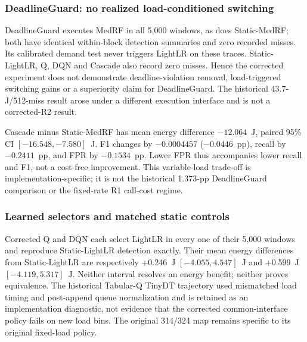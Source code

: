 \begin{table}[t]
\centering\footnotesize
\caption{Headline R2 paired contrasts ($n=10$ blocks). Differences are first-minus-second method; F1 and deadline-miss changes are percentage points.}
\label{tab:r2pairs}
\setlength{\tabcolsep}{5pt}
\end{table}

\subsubsection*{DeadlineGuard: no realized load-conditioned switching}
DeadlineGuard executes MedRF in all 5{,}000 windows, as does Static-MedRF; both have identical within-block detection summaries and zero recorded misses. Its calibrated demand test never triggers LightLR on these traces. Static-LightLR, Q, DQN and Cascade also record zero misses. Hence the corrected experiment does not demonstrate deadline-violation removal, load-triggered switching gains or a superiority claim for DeadlineGuard. The historical 43.7-J/512-miss result arose under a different execution interface and is not a corrected-R2 result.

Cascade minus Static-MedRF has mean energy difference $-12.064$~J, paired 95\% CI $[-16.548,-7.580]$~J. F1 changes by $-0.0004457$ ($-0.0446$~pp), recall by $-0.2411$~pp, and FPR by $-0.1534$~pp. Lower FPR thus accompanies lower recall and F1, not a cost-free improvement. This variable-load trade-off is implementation-specific; it is not the historical 1.373-pp DeadlineGuard comparison or the fixed-rate R1 call-cost regime.

\subsubsection*{Learned selectors and matched static controls}
Corrected Q and DQN each select LightLR in every one of their 5{,}000 windows and reproduce Static-LightLR detection exactly. Their mean energy differences from Static-LightLR are respectively +0.246~J $[-4.055,4.547]$~J and +0.599~J $[-4.119,5.317]$~J. Neither interval resolves an energy benefit; neither proves equivalence. The historical Tabular-Q TinyDT trajectory used mismatched load timing and post-append queue normalization and is retained as an implementation diagnostic, not evidence that the corrected common-interface policy fails on new load bins. The original 314/324 map remains specific to its original fixed-load policy.

